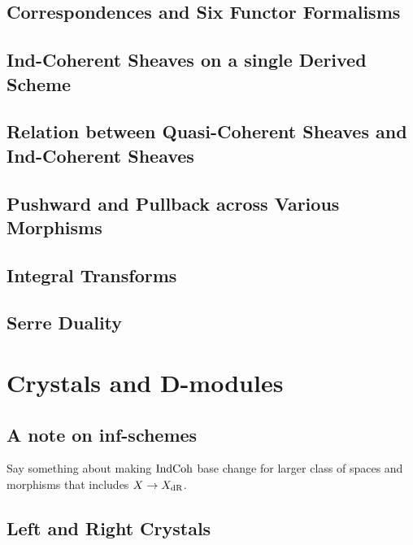 \documentclass{article}
\begin{document}
  \subsection{Correspondences and Six Functor Formalisms}

  \subsection{Ind-Coherent Sheaves on a single Derived Scheme}
    

  \subsection{Relation between Quasi-Coherent Sheaves and Ind-Coherent Sheaves}
    

  \subsection{Pushward and Pullback across Various Morphisms}

  \subsection{Integral Transforms}

  \subsection{Serre Duality}

\section{Crystals and D-modules}

  \subsection{A note on inf-schemes}
  Say something about making $\mathrm{IndCoh}$ base change
  for larger class of spaces and morphisms
  that includes $X \to X_{\mathrm{dR}}$.

  \subsection{Left and Right Crystals}
\end{document}
